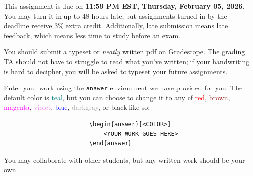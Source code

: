 \documentclass[11pt]{article}
\newcommand{\rd}[1]{\textcolor{red}{#1}}
\begin{document}

This assignment is due on \textbf{11:59 PM EST, Thursday, February 05, 2026}. You may turn it in up to 48 hours late, but assignments turned in by the deadline receive 3\% extra credit.  Additionally, late submission means late feedback, which means less time to study before an exam.

You should submit a typeset or \emph{neatly} written pdf on Gradescope. The grading TA should not have to struggle to read what you've written; if your handwriting is hard to decipher, you will be asked to typeset your future assignments. 

Enter your work using the \verb|answer| environment we have provided for you. The default color is \textcolor{teal}{teal}, but you can choose to change it to any of \rd{red}, \textcolor{brown}{brown}, \textcolor{magenta}{magenta}, \textcolor{violet}{violet}, \textcolor{blue}{blue}, \textcolor{darkgray}{darkgray}, or black like so:
\begin{verbatim}
                        \begin{answer}[<COLOR>]
                            <YOUR WORK GOES HERE> 
                        \end{answer}
\end{verbatim}

You may collaborate with other students, but any written work should be your own. 
\end{document}
